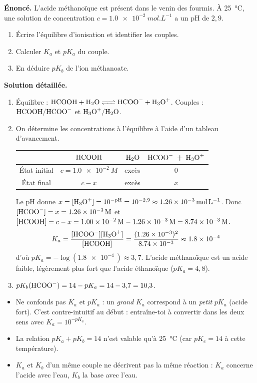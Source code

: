 \documentclass[11pt]{article}
\begin{document}
\begin{exoresolu}
\textbf{Énoncé.} L'acide méthanoïque  est présent dans le venin des fourmis. À \SI{25}{\celsius}, une solution de concentration $c = \SI{1,0e-2}{mol.L^{-1}}$ a un pH de $2{,}9$.
\begin{enumerate}
\item Écrire l'équilibre d'ionisation et identifier les couples.
\item Calculer $K_a$ et $pK_a$ du couple.
\item En déduire $pK_b$ de l'ion méthanoate.
\end{enumerate}
\tcblower
\textbf{Solution détaillée.}
\begin{enumerate}
\item Équilibre : $\ce{HCOOH + H2O <=> HCOO- + H3O+}$. Couples : $\ce{HCOOH}/\ce{HCOO-}$ et $\ce{H3O+}/\ce{H2O}$.
\item On détermine les concentrations à l'équilibre à l'aide d'un tableau d'avancement.
\begin{center}
\begin{tabularx}{\linewidth}{|c|c|c|c|}\hline
 & $\ce{HCOOH}$ & $\ce{H2O}$ & $\ce{HCOO-}$ + $\ce{H3O+}$ \\\hline
État initial & $c = \SI{1,0e-2}{M}$ & excès & $0$ \\\hline
État final & $c - x$ & excès & $x$ \\\hline
\end{tabularx}
\end{center}
Le pH donne $x = [\ce{H3O+}] = 10^{-\mathrm{pH}} = 10^{-2{,}9} \approx \SI{1,26e-3}{mol.L^{-1}}$.
Donc $[\ce{HCOO-}] = x = \SI{1,26e-3}{M}$ et $[\ce{HCOOH}] = c - x = \SI{1,00e-2}{M} - \SI{1,26e-3}{M} = \SI{8,74e-3}{M}$.
\[ K_a = \frac{[\ce{HCOO-}][\ce{H3O+}]}{[\ce{HCOOH}]} = \frac{(\SI{1,26e-3}{})^2}{\SI{8,74e-3}{}} \approx \SI{1,8e-4}{} \]
d'où $pK_a = -\log(\SI{1,8e-4}{}) \approx 3{,}7$. L'acide méthanoïque est un acide faible, légèrement plus fort que l'acide éthanoïque ($pK_a = 4{,}8$).
\item $pK_b(\ce{HCOO-}) = 14 - pK_a = 14 - 3{,}7 = 10{,}3$.
\end{enumerate}
\end{exoresolu}

\begin{attention}
\begin{itemize}
\item Ne confonds pas $K_a$ et $pK_a$ : un \emph{grand} $K_a$ correspond à un \emph{petit} $pK_a$ (acide fort). C'est contre-intuitif au début : entraîne-toi à convertir dans les deux sens avec $K_a = 10^{-pK_a}$.
\item La relation $pK_a + pK_b = 14$ n'est valable qu'à \SI{25}{\celsius} (car $pK_e = 14$ à cette température).
\item $K_a$ et $K_b$ d'un même couple ne décrivent pas la même réaction : $K_a$ concerne l'acide avec l'eau, $K_b$ la base avec l'eau.
\end{itemize}
\end{attention}
\end{document}
